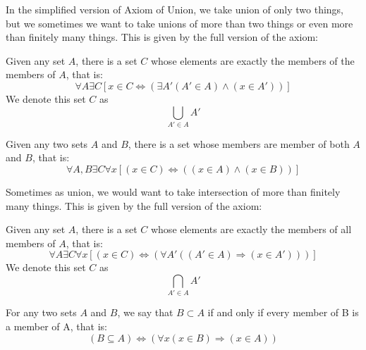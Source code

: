 \documentclass{report}
\begin{document}
			In the simplified version of Axiom of Union, we take union of only two things, but we sometimes we want to take unions of more than two things or even more than finitely many things. This is given by the full version of the axiom:
		
			\begin{axiom} \label{axiom_union_full}
				Given any set $A$, there is a set $C$ whose elements are exactly the members of the members of $A$, that is:
				\begin{displaymath}
					\forall A \exists C [x \in C \Leftrightarrow (\exists A'(A' \in A) \wedge (x \in A'))]
				\end{displaymath}
				We denote this set $C$ as
				\begin{displaymath}
					\bigcup_{A' \in A}A'
				\end{displaymath}
			\end{axiom}

			\begin{axiom} \label{axiom_intersection_simple}
				Given any two sets $A$ and $B$, there is a set whose members are member of both $A$ and $B$, that is:
				\begin{displaymath}
					\forall A,B \exists C \forall x [(x \in C) \Leftrightarrow ((x \in A ) \wedge (x \in B))]
				\end{displaymath}
			\end{axiom}
	
			Sometimes as union, we would want to take intersection of more than finitely many things. This is given by the full version of the axiom:
			
			\begin{axiom} \label{axiom_intersection_full}
				Given any set $A$, there is a set $C$ whose elements are exactly the members of all members of $A$, that is:
				\begin{displaymath}
					\forall A \exists C \forall x [(x \in C) \Leftrightarrow (\forall A'((A' \in A) \Rightarrow (x \in A')))]
				\end{displaymath}
				We denote this set $C$ as
				\begin{displaymath}
					\bigcap_{A' \in A}A'
				\end{displaymath}
			\end{axiom}
		
			\begin{axiom} \label{axiom_subset}
				For any two sets $A$ and $B$, we say that $B \subset A$ if and only if every member of B is a member of A, that is:
				\begin{displaymath}
					(B \subseteq A) \Leftrightarrow (\forall x (x \in B) \Rightarrow (x \in A))
				\end{displaymath}
			\end{axiom}
			
\end{document}
